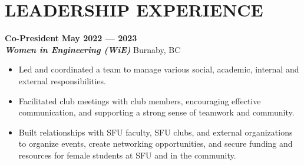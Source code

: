 \documentclass[letterpaper,11pt]{article}
\newcommand{\Item} [1] {
    \item\small{{#1 \vspace{-2pt}}}
}
\newcommand{\employer} [5] {
    {\textbf{#3} \hfill \textbf{#4 --- #5}\\ \textbf{\emph{#1}} \hfill #2\\}
}
\newcommand{\workItemListStart} [0] {
    \vspace{-1pt}
    \begin{itemize}[topsep=0pt,itemsep=-2pt]
}
\newcommand{\workItemListEnd} [0] {
    \end{itemize}
    \vspace{1pt}
}
\begin{document}
    \section{LEADERSHIP EXPERIENCE}
    \employer{Women in Engineering (WiE)}{Burnaby, BC}{Co-President}{May 2022}{2023}
    \workItemListStart{}
        \Item{Led and coordinated a team to manage various social, academic, internal and external responsibilities.}
        \Item{Facilitated club meetings with club members, encouraging effective communication, and supporting a strong sense of teamwork and community.}
        \Item{Built relationships with SFU faculty, SFU clubs, and external organizations to organize events, create networking opportunities, and secure funding and resources for female students at SFU and in the community.}
    \workItemListEnd{}

\end{document}
